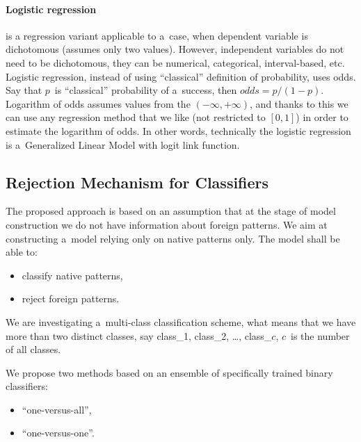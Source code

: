 \documentclass{llncs}
\begin{document}
\paragraph{Logistic regression} is a regression variant applicable to a~case, when dependent variable is dichotomous (assumes only two values). However, independent variables do not need to be dichotomous, they can be numerical, categorical, interval-based, etc. Logistic regression, instead of using ``classical'' definition of probability, uses odds. Say that $p$~is ``classical'' probability of a~success, then $odds = p/(1-p)$. Logarithm of odds assumes values from the $(-\infty,+\infty)$, and thanks to this we can use any regression method that we like (not restricted to $[0,1]$) in order to estimate the logarithm of odds. In other words, technically the logistic regression is a~Generalized Linear Model with logit link function.
\vspace{-3pt}

\subsection{Rejection Mechanism for Classifiers}
\label{sec:rejectionmechanism}
The proposed approach is based on an assumption that at the stage of model construction we do not have information about foreign patterns. We aim at constructing a~model relying only on native patterns only. The model shall be able to:\vspace{-3pt}
\begin{itemize}
\item classify native patterns,
\item reject foreign patterns.
\end{itemize}
\vspace{-3pt} 
We are investigating a~multi-class classification scheme, what means that we have more than two distinct classes, say class\_1, class\_2, \ldots, class\_$c$, $c$~is the number of all classes. 

We propose two methods based on an ensemble of specifically trained binary classifiers:\vspace{-3pt}
\begin{itemize}
\item ``one-versus-all'',
\item ``one-versus-one''.
\end{itemize}
\vspace{-5pt}
\end{document}
